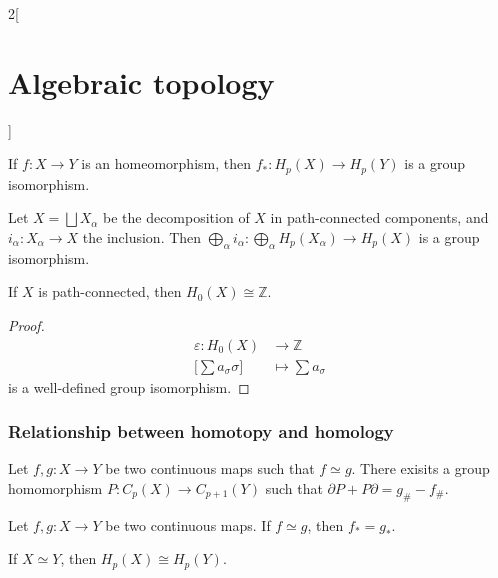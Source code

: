\documentclass[../../../main_math.tex]{subfiles}
\begin{document}
\begin{multicols}{2}[\section{Algebraic topology}]
	\begin{corollary}
		If $f:X\to Y$ is an homeomorphism, then $f_*: H_p(X) \to H_p(Y)$ is a group isomorphism.
	\end{corollary}

	\begin{proposition}
		Let $X=\bigsqcup X_{\alpha}$ be the decomposition of $X$ in path-connected components, and $i_{\alpha}:X_{\alpha} \to X$ the inclusion. Then $\bigoplus_{\alpha} i_{\alpha}: \bigoplus_{\alpha} H_p(X_{\alpha}) \to H_p(X)$ is a group isomorphism.
	\end{proposition}
	
	\begin{proposition}
		If $X$ is path-connected, then $H_0(X)\cong \mathbb{Z}$.
	\end{proposition}

	\begin{proof}
		\begin{align*}
			\varepsilon: H_0(X)&\longrightarrow \mathbb{Z} \\
			\bigg[ \sum a_{\sigma}\sigma \bigg] &\longmapsto \sum a_{\sigma}
		\end{align*}
	is a well-defined group isomorphism.
	\end{proof}
	
	\subsubsection{Relationship between homotopy and homology}
	\begin{lemma}
		Let $f,g:X\to Y$ be two continuous maps such that $f\simeq g$. There exisits a group homomorphism $P: C_p(X)\to C_{p+1}(Y)$ such that $\partial P + P\partial =g_{\#}-f_{\#}$.
	\end{lemma}

	\begin{theorem}
		Let $f,g:X\to Y$ be two continuous maps. If $f\simeq g$, then $f_*=g_*$.
	\end{theorem}

	\begin{corollary}
		If $X\simeq Y$, then $H_p(X)\cong H_p(Y)$.
	\end{corollary}

\end{multicols}
\end{document}

